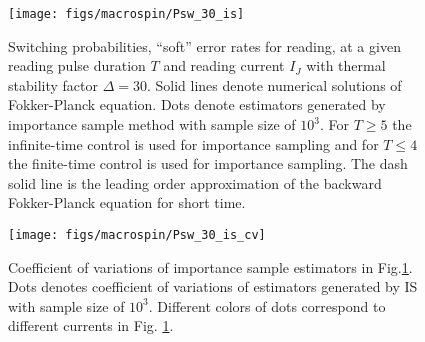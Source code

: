 \documentclass[journal,transmag]{IEEEtran}
\begin{document}
\begin{figure}[h]
   \centering
         \texttt{[image: figs/macrospin/Psw\_30\_is]}
   \caption{Switching probabilities, ``soft'' error rates for reading,  at a given reading pulse duration $T$ and reading current $I_J$ with thermal stability factor $\Delta = 30.$ Solid lines denote numerical solutions of Fokker-Planck equation. Dots denote estimators generated by importance sample method with sample size of $10^3$. For $T \ge 5$ the infinite-time control is used for importance sampling and  for $T \le 4$ the finite-time control is used for importance sampling. The dash solid line is the leading order approximation of the backward Fokker-Planck equation for short time.}
   \label{fig:MacroIS30}
\end{figure}


\begin{figure}[h]
   \centering
         \texttt{[image: figs/macrospin/Psw\_30\_is\_cv]}
   \caption{Coefficient of variations of importance sample estimators in Fig.\ref{fig:MacroIS30}. Dots denotes coefficient of variations  of estimators generated by IS with sample size of $10^3$. Different colors of dots correspond to different currents in Fig. \ref{fig:MacroIS30}.}
   \label{fig:MacroIS30_cv}
\end{figure}
\end{document}
